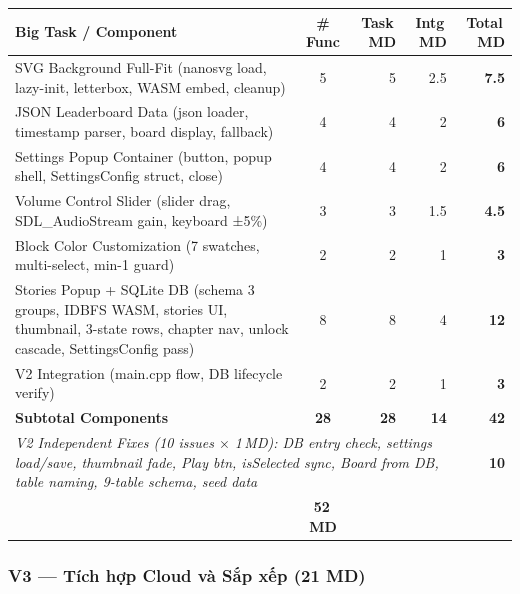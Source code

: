 \documentclass[12pt,a4paper]{article}
\begin{document}
\begin{tabularx}{\linewidth}{|X|c|r|r|r|}
\hline
\rowcolor{consoleOrange!18}
\textbf{Big Task / Component} & \textbf{\# Func} & \textbf{Task\,MD} & \textbf{Intg\,MD} & \textbf{Total\,MD} \\
\hline
\rowcolor{rowLight}
SVG Background Full-Fit (nanosvg load, lazy-init, letterbox, WASM embed, cleanup) & 5 &
5 & 2.5 & \textbf{7.5} \\
JSON Leaderboard Data (json loader, timestamp parser, board display, fallback) & 4 & 4 & 2 & \textbf{6} \\
\rowcolor{rowLight}
Settings Popup Container (button, popup shell, SettingsConfig struct, close) & 4 & 4 & 2 & \textbf{6} \\
Volume Control Slider (slider drag, SDL\_AudioStream gain, keyboard ±5\%) & 3 & 3 & 1.5 & \textbf{4.5} \\
\rowcolor{rowLight}
Block Color Customization (7 swatches, multi-select, min-1 guard) & 2 & 2 & 1 & \textbf{3} \\
Stories Popup + SQLite DB (schema 3 groups, IDBFS WASM, stories UI, thumbnail, 3-state rows, chapter nav, unlock cascade, SettingsConfig pass) & 8 & 8 & 4
& \textbf{12} \\
\rowcolor{rowLight}
V2 Integration (main.cpp flow, DB lifecycle verify) & 2 & 2 & 1 & \textbf{3} \\
\hline
\rowcolor{consoleOrange!12}
\textbf{Subtotal Components} & \textbf{28} & \textbf{28} & \textbf{14} & \textbf{42} \\
\hline
\multicolumn{4}{|p{0.82\linewidth}|}{\raggedright \textit{V2 Independent Fixes (10 issues $\times$ 1\,MD): DB entry check, settings load/save, thumbnail fade, Play btn, isSelected sync, Board from DB, table naming, 9-table schema, seed data}} & \textbf{10} \\
\hline
\rowcolor{v2amber!15}
\multicolumn{4}{|l|}{\textbf{V2 Grand Total}} & \textbf{52\,MD} \\
\hline
\end{tabularx}

\subsubsection{V3 — Tích hợp Cloud và Sắp xếp (21 MD)}
\end{document}

